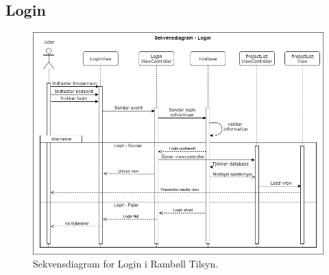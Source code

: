 \subsection{Login}

\begin{figure}[H] %
	\centering
	\includegraphics[width=1.1\textwidth]{../ArkitekturDesign/Design/Login/LoginSekvensDiagram}
	\caption{Sekvensdiagram for Login i Rambøll Tilsyn.}
	\label{fig:LoginSekvens}
\end{figure}